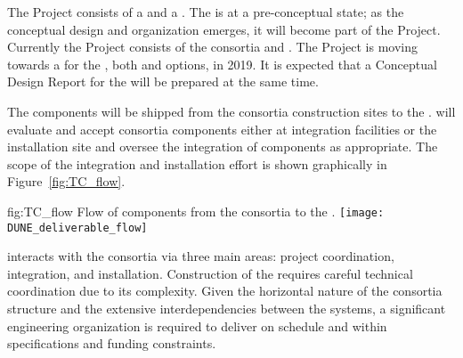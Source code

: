 The  Project consists of a  and a
. The  is at a pre-conceptual state; as the
conceptual design and organization emerges, it will become part of the
 Project. Currently the  Project consists of
the   consortia and .  The
 Project is moving towards a  for
the , both \single and \dual options, in 2019. It is
expected that a Conceptual Design Report for the  will be
prepared at the same time. 

The  components will be shipped
from the consortia construction sites to the . 
 will
evaluate and accept consortia components either at integration
facilities or the installation site and oversee the integration of
components as appropriate. The scope of the  integration
and installation effort is shown graphically in
Figure~\ref{fig:TC_flow}.

\begin{dunefigure}{fig:TC_flow}
  {Flow of components from the consortia to the .}
 \texttt{[image: DUNE\_deliverable\_flow]}
\end{dunefigure}

 interacts with the consortia via three main areas: project
coordination, integration, and installation.  Construction of the
  requires careful technical coordination due to
its complexity.  Given the horizontal nature of the consortia
structure and the extensive interdependencies between the systems, a
significant engineering organization is required to deliver
 on schedule and within specifications and funding
constraints.

